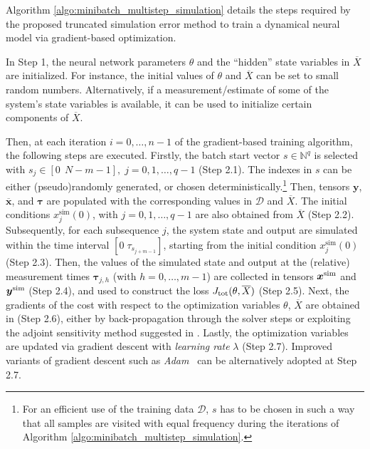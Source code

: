 \documentclass{article} %
\newcommand{\batchsize}{q}
\newcommand{\seqlen}{m}
\newcommand{\nsamp}{N}
\newcommand{\tens}[1]{\bm{#1}}
\newcommand{\Did}{{\mathcal{D}}}
\newcommand{\simul}[1]{{#1}^{\rm sim}}
\newcommand{\hidden}[1]{\overline{#1}}
\newcommand{\est}{}
\begin{document}
 Algorithm \ref{algo:minibatch_multistep_simulation} details   the steps  required by the proposed truncated simulation error method   
 to train  a dynamical neural model via gradient-based optimization. 
 
 In Step 1, the neural network parameters $\theta$ and the ``hidden'' state variables in $\hidden{X}$ are initialized. For instance, the initial values of  $\theta$ and  $\hidden{X}$ can be set to small random numbers. Alternatively, if a measurement/estimate of some of the system's state variables is available, it can be used to initialize certain  components of $\hidden{X}$. 
 
 
   Then, at each iteration $i=0,\ldots,n-1$ of the gradient-based training algorithm, the following steps are executed.   
Firstly, the batch start vector $s \in \mathbb{N}^\batchsize$ is selected with $s_j \in [0 \ \  \nsamp-\seqlen-1],\; j=0,1,\dots,\batchsize-1$ (Step 2.1). The indexes in $s$ can be either (pseudo)randomly generated, or chosen deterministically.\footnote{For an efficient use of the training data $\Did$, $s$ has to be chosen in such a way that all samples are visited with equal frequency  during the  iterations of Algorithm \ref{algo:minibatch_multistep_simulation}.}  
Then,  tensors ${{\tens{y}}}$, ${\hidden{\tens{x}}}$,  and ${{\tens{\tau}}}$ are populated with the corresponding values in $\Did$ and $\hidden{X}$. The initial conditions ${x}^{\mathrm{sim}}_{j}(0)$, with $j=0,1,\dots,\batchsize-1$ are also obtained from $\hidden{X}$  (Step 2.2). 
Subsequently, for each subsequence $j$, the system state and output are simulated within the time interval $[0\; \tau_{s_{j+\seqlen - 1}}]$, starting from the initial condition ${x}^{\mathrm{sim}}_{j}(0)$  (Step 2.3). Then, the values of the simulated state and output at the (relative) measurement times $\tens{\tau}_{j,h}$ (with $h=0,\ldots,\seqlen-1$) are collected in tensors $\simul{\est{\tens{x}}}$ and $\simul{{\tens{y}}}$ (Step 2.4), and  used to  construct the loss $J_{\rm tot}(\theta,\hidden{X})$  (Step 2.5).
Next, the gradients of the cost with respect to the optimization variables $\theta$, $\hidden{X}$ are obtained in (Step 2.6), either by back-propagation through the solver steps or exploiting the adjoint sensitivity method suggested in \cite{chen2018neural}.
Lastly, the optimization variables are updated via gradient descent with \emph{learning rate} $\lambda$ (Step 2.7). Improved variants of  gradient descent  such as \emph{Adam}~\citep{kingma2014adam} can be alternatively adopted at Step 2.7. 
\end{document}
